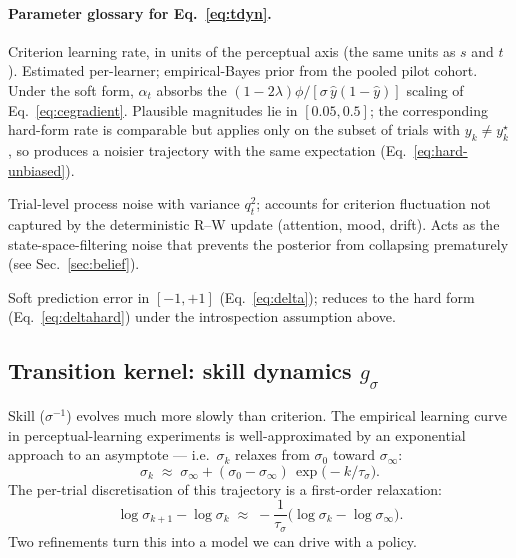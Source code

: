 \documentclass[11pt]{article}
\begin{document}
\paragraph{Parameter glossary for Eq.~\ref{eq:tdyn}.}
\begin{description}[leftmargin=2.2em,style=nextline,itemsep=1pt]
  \item[$\alpha_t \ge 0$.] Criterion learning rate, in units of the
    perceptual axis (the same units as $s$ and $t$). Estimated
    per-learner; empirical-Bayes prior from the pooled pilot cohort.
    Under the soft form, $\alpha_t$ absorbs the $(1{-}2\lambda)\phi/
    [\sigma\,\hat y(1{-}\hat y)]$ scaling of Eq.~\ref{eq:cegradient}.
    Plausible magnitudes lie in $[0.05, 0.5]$; the corresponding
    hard-form rate \citep{stuttgen2011trial} is comparable but
    applies only on the subset of trials with $y_k \neq y_k^{\star}$,
    so produces a noisier trajectory with the same expectation
    (Eq.~\ref{eq:hard-unbiased}).
  \item[$\xi_{t,k}$.] Trial-level process noise with variance $q_t^2$;
    accounts for criterion fluctuation not captured by the
    deterministic R--W update (attention, mood, drift). Acts as the
    state-space-filtering noise that prevents the posterior from
    collapsing prematurely (see Sec.~\ref{sec:belief}).
  \item[$\delta_k$.] Soft prediction error in $[-1, +1]$
    (Eq.~\ref{eq:delta}); reduces to the hard form
    (Eq.~\ref{eq:deltahard}) under the introspection assumption above.
\end{description}

\subsection{Transition kernel: skill dynamics $g_\sigma$}
\label{sec:gsig}

Skill ($\sigma^{-1}$) evolves much more slowly than criterion. The
empirical learning curve in perceptual-learning experiments is
well-approximated by an exponential approach to an asymptote — i.e.\
$\sigma_k$ relaxes from $\sigma_0$ toward $\sigma_\infty$:
\begin{equation}
  \sigma_k \;\approx\;
    \sigma_\infty + (\sigma_0 - \sigma_\infty)\,
    \exp\!\bigl(-k/\tau_\sigma\bigr).
  \label{eq:sigmaschedule}
\end{equation}
The per-trial discretisation of this trajectory is a first-order
relaxation:
\begin{equation}
  \log\sigma_{k+1} - \log\sigma_k
  \;\approx\; -\frac{1}{\tau_\sigma}\bigl(\log\sigma_k - \log\sigma_\infty\bigr).
  \label{eq:sigma-relax}
\end{equation}
Two refinements turn this into a model we can drive with a policy.
\end{document}
